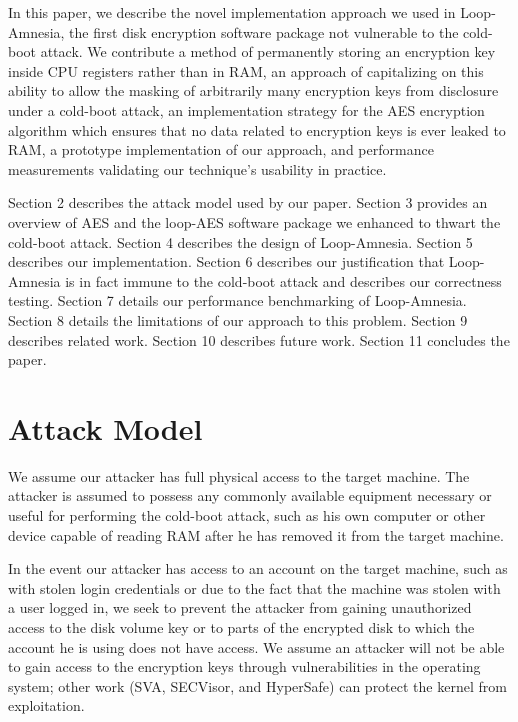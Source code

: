 \documentclass[letterpaper,twocolumn,nonatbib,10pt]{article}
\begin{document}
In this paper, we describe the novel implementation approach we used
in Loop-Amnesia, the first disk encryption software package not
vulnerable to the cold-boot attack.  We contribute a method of
permanently storing an encryption key inside CPU registers rather than
in RAM, an approach of capitalizing on this ability to allow the
masking of arbitrarily many encryption keys from disclosure under a
cold-boot attack, an implementation strategy for the AES encryption
algorithm which ensures that no data related to encryption keys is
ever leaked to RAM, a prototype implementation of our approach, and
performance measurements validating our technique's usability in
practice.

Section 2 describes the attack model used by our paper.  Section 3
provides an overview of AES and the loop-AES software package we
enhanced to thwart the cold-boot attack.  Section 4 describes the
design of Loop-Amnesia.  Section 5 describes our implementation.
Section 6 describes our justification that Loop-Amnesia is in fact
immune to the cold-boot attack and describes our correctness testing.
Section 7 details our performance benchmarking of Loop-Amnesia.
Section 8 details the limitations of our approach to this problem.
Section 9 describes related work.  Section 10 describes future work.
Section 11 concludes the paper.

\section{Attack Model}

We assume our attacker has full physical access to the target machine.
The attacker is assumed to possess any commonly available equipment
necessary or useful for performing the cold-boot attack, such as his
own computer or other device capable of reading RAM after he has
removed it from the target machine.

In the event our attacker has access to an account on the target
machine, such as with stolen login credentials or due to the fact that
the machine was stolen with a user logged in, we seek to prevent the
attacker from gaining unauthorized access to the disk volume key or to
parts of the encrypted disk to which the account he is using does not
have access.  We assume an attacker will not be able to gain access to
the encryption keys through vulnerabilities in the operating system;
other work (SVA\cite{sva}, SECVisor\cite{secvisor}, and
HyperSafe\cite{hypersafe}) can protect the kernel from exploitation.
\end{document}
